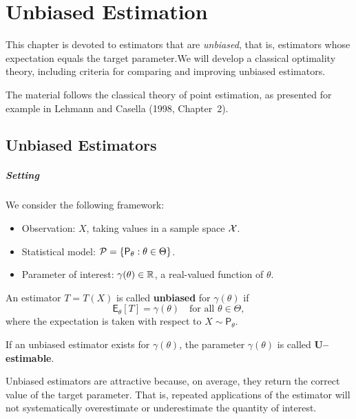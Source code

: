 \chapter{Unbiased Estimation}

This chapter is devoted to estimators that are \emph{unbiased}, that is, estimators
whose expectation equals the target parameter.We will develop a
classical optimality theory, including criteria for comparing and improving
unbiased estimators.

The material follows the classical theory of point estimation, as presented for
example in Lehmann and Casella (1998, Chapter~2). 

\section{Unbiased Estimators}%
\label{sec:ube}

\paragraph{Setting}
We consider the following framework:
\begin{itemize}
    \item Observation: \(X\), taking values in a sample space \(\mathcal{X}\).
    \item Statistical model: \(\mathcal{P} = \{\mathsf{P}_\theta : \theta \in \Theta\}\).
    \item Parameter of interest: \(\gamma(\theta) \in \mathbb{R}\), a real-valued function of \(\theta\).
\end{itemize}

\begin{definition}[]
    An estimator \(T = T(X)\) is called \textbf{unbiased} for \(\gamma(\theta)\) if
    \[
        \mathsf{E}_\theta[T] = \gamma(\theta) \quad \text{for all } \theta \in \Theta,
    \]
    where the expectation is taken with respect to \(X \sim \mathsf{P}_\theta\).

    If an unbiased estimator exists for \(\gamma(\theta)\), the parameter \(\gamma(\theta)\) is called \textbf{U--estimable}.
\end{definition}

Unbiased estimators are attractive because, on average, they return the correct value of the target parameter. That is, repeated applications of the estimator will not systematically overestimate or underestimate the quantity of interest.  

